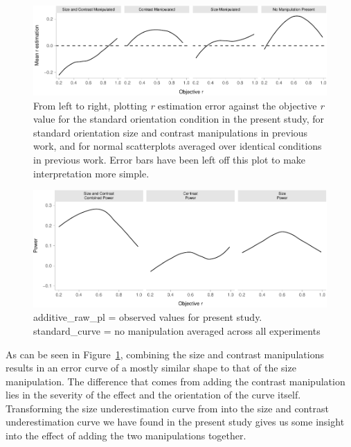 \documentclass[manuscript, review, anonymous, screen]{acmart}
\begin{document}
\begin{figure}

{\centering \includegraphics[width=1\textwidth,height=\textheight]{size_and_contrast_new_files/figure-pdf/fig-error-bars-all-exp-1.pdf}

}

\caption{\label{fig-error-bars-all-exp}From left to right, plotting
\emph{r} estimation error against the objective \emph{r} value for the
standard orientation condition in the present study, for standard
orientation size and contrast manipulations in previous work, and for
normal scatterplots averaged over identical conditions in previous work.
Error bars have been left off this plot to make interpretation more
simple.}

\end{figure}

\begin{figure}

{\centering \includegraphics[width=1\textwidth,height=\textheight]{size_and_contrast_new_files/figure-pdf/fig-power-plot-1.pdf}

}

\caption{\label{fig-power-plot}additive\_raw\_pl = observed values for
present study. standard\_curve = no manipulation averaged across all
experiments}

\end{figure}

As can be seen in Figure~\ref{fig-error-bars-all-exp}, combining the
size and contrast manipulations results in an error curve of a mostly
similar shape to that of the size manipulation. The difference that
comes from adding the contrast manipulation lies in the severity of the
effect and the orientation of the curve itself. Transforming the size
underestimation curve from \citet{strain_2023} into the size and
contrast underestimation curve we have found in the present study gives
us some insight into the effect of adding the two manipulations
together.




\end{document}
